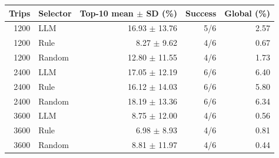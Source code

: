 \begin{tabular}{rlrrr}
\toprule
Trips & Selector & Top-10 mean $\pm$ SD (\%) & Success & Global (\%) \\
\midrule
1200 & LLM & 16.93 $\pm$ 13.76 & 5/6 & 2.57 \\
1200 & Rule & 8.27 $\pm$ 9.62 & 4/6 & 0.67 \\
1200 & Random & 12.80 $\pm$ 11.55 & 4/6 & 1.73 \\
2400 & LLM & 17.05 $\pm$ 12.19 & 6/6 & 6.40 \\
2400 & Rule & 16.12 $\pm$ 14.03 & 6/6 & 5.80 \\
2400 & Random & 18.19 $\pm$ 13.36 & 6/6 & 6.34 \\
3600 & LLM & 8.75 $\pm$ 12.00 & 4/6 & 0.56 \\
3600 & Rule & 6.98 $\pm$ 8.93 & 4/6 & 0.81 \\
3600 & Random & 8.81 $\pm$ 11.97 & 4/6 & 0.44 \\
\bottomrule
\end{tabular}
